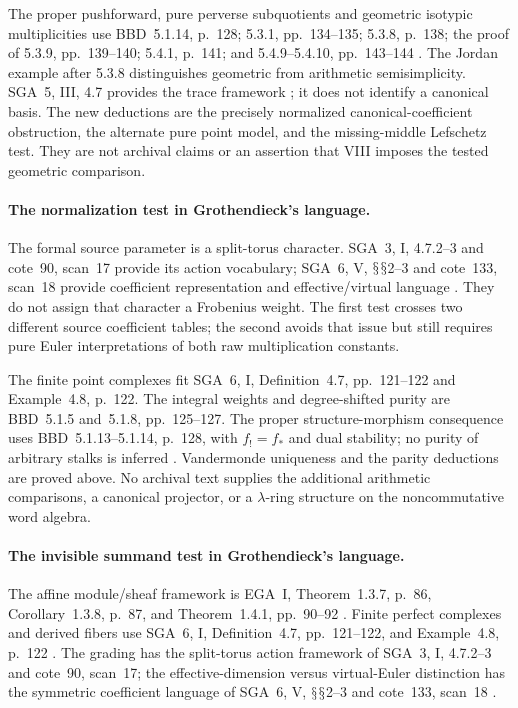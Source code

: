 \documentclass[11pt,a4paper]{article}
\renewcommand{\S}{\ensuremath{\mathsection}}
\theoremstyle{named}\newtheorem{finding}{Finding}[section]
\theoremstyle{definition}\newtheorem{definition}[finding]{Definition}
\theoremstyle{remark}\newtheorem{remark}[finding]{Remark}
\begin{document}
The proper pushforward, pure perverse subquotients and
geometric isotypic multiplicities use BBD~5.1.14,
p.~128; 5.3.1, pp.~134--135; 5.3.8, p.~138;
the proof of 5.3.9, pp.~139--140; 5.4.1, p.~141;
and 5.4.9--5.4.10, pp.~143--144 \cite{BBD}.
The Jordan example after 5.3.8 distinguishes geometric
from arithmetic semisimplicity. SGA~5, III, 4.7
provides the trace framework \cite{SGA5}; it does
not identify a canonical basis. The new deductions
are the precisely normalized canonical-coefficient
obstruction, the alternate pure point model, and the
missing-middle Lefschetz test. They are not archival
claims or an assertion that VIII imposes the tested
geometric comparison.

\paragraph{The normalization test in Grothendieck's language.}
The formal source parameter is a split-torus character.
SGA~3, I, 4.7.2--3 and cote~90, scan~17 provide its
action vocabulary; SGA~6, V, \S\S2--3 and cote~133,
scan~18 provide coefficient representation and
effective/virtual language \cite{SGA3,SGA6,Archive}.
They do not assign that character a Frobenius weight.
The first test crosses two different source coefficient
tables; the second avoids that issue but still requires
pure Euler interpretations of both raw multiplication constants.

The finite point complexes fit SGA~6, I, Definition~4.7,
pp.~121--122 and Example~4.8, p.~122.
The integral weights and degree-shifted purity are
BBD~5.1.5 and~5.1.8, pp.~125--127.
The proper structure-morphism consequence uses
BBD~5.1.13--5.1.14, p.~128, with \(f_!=f_*\) and dual
stability; no purity of arbitrary stalks is inferred
\cite{SGA6,BBD}.
Vandermonde uniqueness and the parity deductions are
proved above. No archival text supplies the additional
arithmetic comparisons, a canonical projector, or a
\(\lambda\)-ring structure on the noncommutative word algebra.

\paragraph{The invisible summand test in Grothendieck's language.}
The affine module/sheaf framework is EGA~I,
Theorem~1.3.7, p.~86, Corollary~1.3.8, p.~87,
and Theorem~1.4.1, pp.~90--92 \cite{EGA}.
Finite perfect complexes and derived fibers use
SGA~6, I, Definition~4.7, pp.~121--122, and
Example~4.8, p.~122 \cite{SGA6}.
The grading has the split-torus action framework
of SGA~3, I, 4.7.2--3 and cote~90, scan~17;
the effective-dimension versus virtual-Euler distinction
has the symmetric coefficient language of SGA~6,
V, \S\S2--3 and cote~133, scan~18
\cite{SGA3,SGA6,Archive}.
\end{document}
